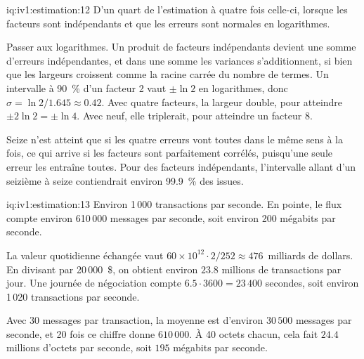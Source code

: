 \begin{solution}{iq:iv1:estimation:12}
D'un quart de l'estimation à quatre fois celle-ci, lorsque les facteurs sont indépendants et que les erreurs sont normales en logarithmes.

Passer aux logarithmes. Un produit de facteurs indépendants devient une somme d'erreurs indépendantes, et dans une somme les variances s'additionnent, si bien que les largeurs croissent comme la racine carrée du nombre de termes. Un intervalle à 90~\% d'un facteur 2 vaut $\pm \ln 2$ en logarithmes, donc $\sigma = \ln 2/1.645 \approx 0.42$. Avec quatre facteurs, la largeur double, pour atteindre $\pm 2 \ln 2 = \pm \ln 4$. Avec neuf, elle triplerait, pour atteindre un facteur 8.

Seize n'est atteint que si les quatre erreurs vont toutes dans le même sens à la fois, ce qui arrive si les facteurs sont parfaitement corrélés, puisqu'une seule erreur les entraîne toutes. Pour des facteurs indépendants, l'intervalle allant d'un seizième à seize contiendrait environ 99.9~\% des issues.

\end{solution}

\begin{solution}{iq:iv1:estimation:13}
Environ 1\,000 transactions par seconde. En pointe, le flux compte environ 610\,000 messages par seconde, soit environ 200 mégabits par seconde.

La valeur quotidienne échangée vaut $60 \times 10^{12} \cdot 2/252 \approx 476$~milliards de dollars. En divisant par 20\,000~\$, on obtient environ $23.8$ millions de transactions par jour. Une journée de négociation compte $6.5 \cdot 3600 = 23\,400$ secondes, soit environ 1\,020 transactions par seconde.

Avec 30 messages par transaction, la moyenne est d'environ $30\,500$ messages par seconde, et 20 fois ce chiffre donne $610\,000$. À 40 octets chacun, cela fait $24.4$ millions d'octets par seconde, soit $195$ mégabits par seconde.

\end{solution}

